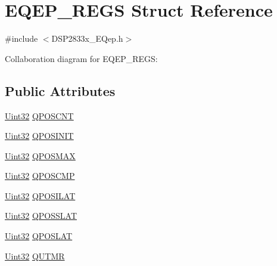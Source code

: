 \hypertarget{struct_e_q_e_p___r_e_g_s}{}\section{E\+Q\+E\+P\+\_\+\+R\+E\+G\+S Struct Reference}
\label{struct_e_q_e_p___r_e_g_s}


{\ttfamily \#include $<$D\+S\+P2833x\+\_\+\+E\+Qep.\+h$>$}



Collaboration diagram for E\+Q\+E\+P\+\_\+\+R\+E\+G\+S\+:
\subsection*{Public Attributes}
\begin{DoxyCompactItemize}
\item 
\hyperlink{_d_s_p2833x___device_8h_aba99025e657f892beb7ff31cecf64653}{Uint32} \hyperlink{struct_e_q_e_p___r_e_g_s_a620c5451be1851a810fd0b32cf61ba2f}{Q\+P\+O\+S\+C\+N\+T}
\item 
\hyperlink{_d_s_p2833x___device_8h_aba99025e657f892beb7ff31cecf64653}{Uint32} \hyperlink{struct_e_q_e_p___r_e_g_s_aa9ade24dd4438724b26b705bbd2c95c2}{Q\+P\+O\+S\+I\+N\+I\+T}
\item 
\hyperlink{_d_s_p2833x___device_8h_aba99025e657f892beb7ff31cecf64653}{Uint32} \hyperlink{struct_e_q_e_p___r_e_g_s_aa50f40583385cd121aba6aa8859714de}{Q\+P\+O\+S\+M\+A\+X}
\item 
\hyperlink{_d_s_p2833x___device_8h_aba99025e657f892beb7ff31cecf64653}{Uint32} \hyperlink{struct_e_q_e_p___r_e_g_s_a2f75adff5448cdb43f8a3fdbb9f3e0ba}{Q\+P\+O\+S\+C\+M\+P}
\item 
\hyperlink{_d_s_p2833x___device_8h_aba99025e657f892beb7ff31cecf64653}{Uint32} \hyperlink{struct_e_q_e_p___r_e_g_s_ac2fc3bd5c1d31dccc1526b52fbe69af8}{Q\+P\+O\+S\+I\+L\+A\+T}
\item 
\hyperlink{_d_s_p2833x___device_8h_aba99025e657f892beb7ff31cecf64653}{Uint32} \hyperlink{struct_e_q_e_p___r_e_g_s_a269e00259a286732b3ed95d87611d52f}{Q\+P\+O\+S\+S\+L\+A\+T}
\item 
\hyperlink{_d_s_p2833x___device_8h_aba99025e657f892beb7ff31cecf64653}{Uint32} \hyperlink{struct_e_q_e_p___r_e_g_s_a7bbe293c2e851c385ddcdd179ffa8a32}{Q\+P\+O\+S\+L\+A\+T}
\item 
\hyperlink{_d_s_p2833x___device_8h_aba99025e657f892beb7ff31cecf64653}{Uint32} \hyperlink{struct_e_q_e_p___r_e_g_s_ab15a2d350b0c536913fac8dabba0a107}{Q\+U\+T\+M\+R}

\end{DoxyCompactItemize}

